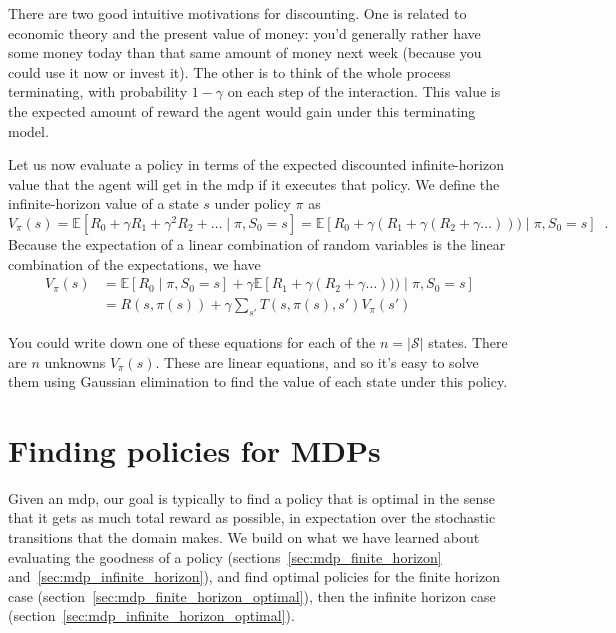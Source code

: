 There are two good intuitive motivations for discounting.  One is
related to economic theory and the present value of money:   you'd
generally  rather have some money today than that same amount of money
next week (because you could use it now or invest it).  The other is
to think of the whole process  terminating, with probability
$1-\gamma$  on  each step of the interaction.    This  value  is the
expected amount of reward the  agent  would gain under  this
terminating model.

Let us now evaluate a policy in terms of the expected discounted
infinite-horizon value that the agent will get in the {\sc mdp} if it
executes that policy.  We define the infinite-horizon value of a state
$s$ under policy $\pi$ as
\begin{equation}
 V_{\pi}(s) = \mathbb{E}[R_0 + \gamma R_1 + \gamma^2 R_2 +
\dots \mid \pi, S_0 = s] = \mathbb{E}[R_0 + \gamma(R_1 + \gamma(R_2 + \gamma
\dots))) \mid \pi, S_0 = s] \;\;.
\end{equation}
Because the expectation of a linear combination of random variables is
the linear combination of the expectations, we have
\begin{align}
V_{\pi}(s) & = \mathbb{E}[R_0 \mid \pi, S_0 = s] + \gamma  \mathbb{E}[
R_1 + \gamma(R_2 + \gamma \dots))) \mid \pi, S_0 = s] 
\nonumber
\\
         & = R(s, \pi(s)) + \gamma\sum_{s'}T(s, \pi(s), s')V_{\pi}(s')
\label{eq:inifite_horiz_value}
\end{align}

You could write down one of these equations for each of the $n =
|\mathcal  S|$ states. There are $n$ unknowns $V_{\pi}(s)$.  These
are linear equations,  and  so it's  easy  to solve them using
Gaussian elimination to find the value of each state under this
policy.

\section{Finding policies for MDPs}

\label{sec:finding_mdp_policies}

Given an {\sc mdp}, our goal is typically to find a policy that is
optimal in the sense that it gets as much total reward as possible, in
expectation over the stochastic transitions that the domain makes.  We
build on what we have learned about evaluating the goodness of a
policy (sections~\ref{sec:mdp_finite_horizon}
and~\ref{sec:mdp_infinite_horizon}), and find optimal policies for the
finite horizon case (section~\ref{sec:mdp_finite_horizon_optimal}),
then the infinite horizon case
(section~\ref{sec:mdp_infinite_horizon_optimal}).

